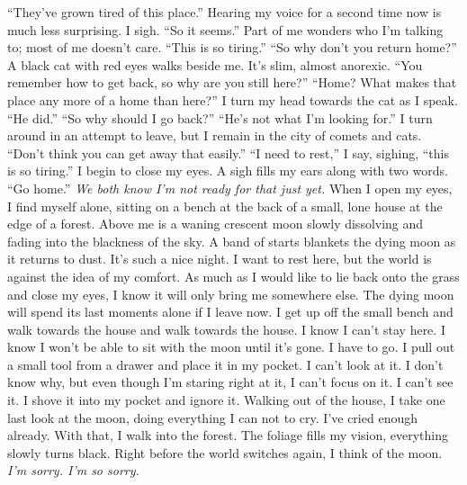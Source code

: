\documentclass[a4paper, 12pt]{book}
\newcommand\tab[1][1cm]{\hspace*{#1}}
\begin{document}
\newline
\tab
``They’ve grown tired of this place.'' Hearing my voice for a second time now is much less surprising.
\newline
\tab
I sigh. ``So it seems.'' Part of me wonders who I’m talking to; most of me doesn’t care. ``This is so tiring.''
\newline
\tab
``So why don’t you return home?'' A black cat with red eyes walks beside me. It’s slim, almost anorexic. ``You remember how to get back, so why are you still here?''
\newline
\tab
``Home? What makes that place any more of a home than here?'' I turn my head towards the cat as I speak.
\newline
\tab
``He did.''
\newline
\tab
``So why should I go back?''
\newline
\tab
``He’s not what I’m looking for.'' I turn around in an attempt to leave, but I remain in the city of comets and cats.
\newline
\tab
``Don’t think you can get away that easily.''
\newline
\tab
``I need to rest,'' I say, sighing, ``this is so tiring.''
\newline
\tab
I begin to close my eyes. A sigh fills my ears along with two words. ``Go home.'' \textit{We both know I’m not ready for that just yet.}
\newline
\tab
When I open my eyes, I find myself alone, sitting on a bench at the back of a small, lone house at the edge of a forest. Above me is a waning crescent moon slowly dissolving and fading into the blackness of the sky. A band of starts blankets the dying moon as it returns to dust. It’s such a nice night. I want to rest here, but the world is against the idea of my comfort. As much as I would like to lie back onto the grass and close my eyes, I know it will only bring me somewhere else. The dying moon will spend its last moments alone if I leave now.
\newline
\tab
I get up off the small bench and walk towards the house and walk towards the house. I know I can’t stay here. I know I won’t be able to sit with the moon until it’s gone. I have to go. I pull out a small tool from a drawer and place it in my pocket. I can’t look at it. I don’t know why, but even though I’m staring right at it, I can’t focus on it. I can’t see it. I shove it into my pocket and ignore it. Walking out of the house, I take one last look at the moon, doing everything I can not to cry. I’ve cried enough already. With that, I walk into the forest. The foliage fills my vision, everything slowly turns black. Right before the world switches again, I think of the moon. \textit{I’m sorry. I’m so sorry.}
\end{document}

